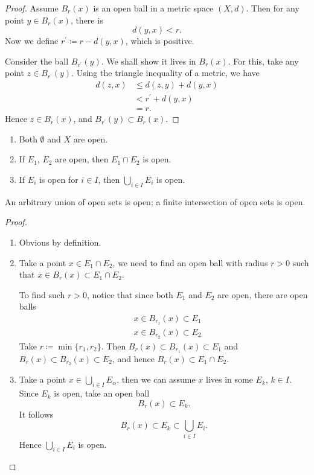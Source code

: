 \begin{proof}
Assume $B_r(x)$ is an open ball in a metric space $(X,d)$. Then for any point $y\in B_r(x)$, there is
\[ d(y,x)<r. \]
Now we define $r^\prime\coloneqq r-d(y,x)$, which is positive.

Consider the ball $B_{r^\prime}(y)$. We shall show it lives in $B_r(x)$. For this, take any point $z\in B_{r^\prime}(y)$. Using the triangle inequality of a metric, we have
\begin{align*}
d(z,x)&\le d(z,y)+d(y,x)\\
&<r^\prime+d(y,x)\\
&=r.
\end{align*}
Hence $z\in B_r(x)$, and $B_{r^\prime}(y)\subset B_r(x)$.
\end{proof}

\begin{proposition}
\begin{enumerate}[label=(\arabic*)]
\item Both $\emptyset$ and $X$ are open.
\item If $E_1$, $E_2$ are open, then $E_1\cap E_2$ is open.
\item If $E_i$ is open for $i\in I$, then $\bigcup_{i\in I}E_i$ is open.
\end{enumerate}
\end{proposition}

An arbitrary union of open sets is open; a finite intersection of open sets is open.

\begin{proof} \
\begin{enumerate}[label=(\arabic*)]
\item Obvious by definition.
\item Take a point $x\in E_1\cap E_2$, we need to find an open ball with radius $r>0$ such that $x\in B_r(x)\subset E_1\cap E_2$.

To find such $r>0$, notice that since both $E_1$ and $E_2$ are open, there are open balls
\begin{align*}
&x\in B_{r_1}(x)\subset E_1\\
&x\in B_{r_2}(x)\subset E_2
\end{align*}
Take $r\coloneqq\min\{r_1,r_2\}$. Then $B_r(x)\subset B_{r_1}(x)\subset E_1$ and $B_r(x)\subset B_{r_2}(x)\subset E_2$, and hence $B_r(x)\subset E_1\cap E_2$.

\item Take a point $x\in\bigcup_{i\in I}E_\alpha$, then we can assume $x$ lives in some $E_k$, $k\in I$. Since $E_k$ is open, take an open ball 
\[B_r(x)\subset E_k.\]
It follows
\[B_r(x)\subset E_k\subset\bigcup_{i\in I}E_i.\]
Hence $\bigcup_{i\in I}E_i$ is open.
\end{enumerate}
\end{proof}

